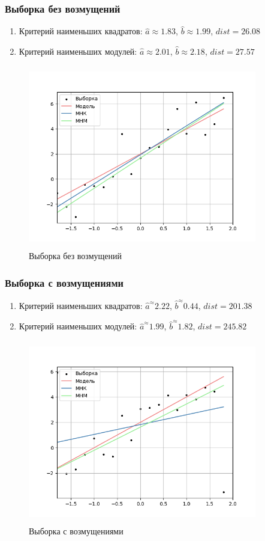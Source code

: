 \documentclass[main.tex]{subfiles}
\begin{document}
\subsubsection{Выборка без возмущений}
\begin{enumerate}
	\item{Критерий наименьших квадратов:}
	$\hat{a}\approx 1.83$, $\hat{b}\approx 1.99$, $dist = 26.08$
	\item{Критерий наименьших модулей:}
	$\hat{a}\approx 2.01$, $\hat{b}\approx 2.18$, $dist = 27.57$
\end{enumerate}
\begin{figure}[ht]
	\centering
	\includegraphics[width = 10cm, height = 8cm]{../images/regression/6_1.png}
	\caption{Выборка без возмущений}
	\label{w/o_pert}
\end{figure}

\FloatBarrier
\subsubsection{Выборка с возмущениями}
\begin{enumerate}
	\item{Критерий наименьших квадратов:}
	$\hat{a}^\approx 2.22$, $\hat{b}^\approx 0.44$, $dist = 201.38$
	\item{Критерий наименьших модулей:}
	$\hat{a}^\approx 1.99$, $\hat{b}^\approx 1.82$, $dist = 245.82$
\end{enumerate}
\begin{figure}[ht]
	\centering
	\includegraphics[width = 10cm, height = 8cm]{../images/regression/6_2.png}
	\caption{Выборка с возмущениями}
	\label{w_pert}
\end{figure}
\end{document}
